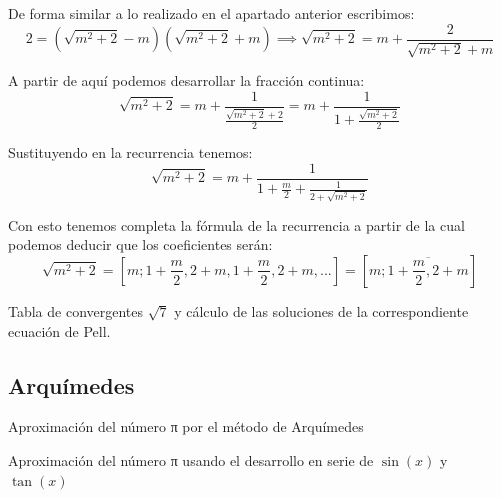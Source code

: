 \begin{problem}[27]
\spart

De forma similar a lo realizado en el apartado anterior escribimos:
\[2=(\sqrt{m^2+2}-m)(\sqrt{m^2+2}+m) \implies \sqrt{m^2+2} = m + \frac{2}{\sqrt{m^2+2}+m}\]

A partir de aquí podemos desarrollar la fracción continua:
\[\sqrt{m^2+2} = m + \frac{1}{\frac{\sqrt{m^2+2}+2}{2}}=m + \frac{1}{1+\frac{\sqrt{m^2+2}}{2}}\]

Sustituyendo en la recurrencia tenemos:
\[\sqrt{m^2+2}  = m + \frac{1}{1+\frac{m}{2}+\frac{1}{2+\sqrt{m^2+2}}} \]

Con esto tenemos completa la fórmula de la recurrencia a partir de la cual podemos deducir que los coeficientes serán:
\[\sqrt{m^2+2}=[m;1+\frac{m}{2},2+m,1+\frac{m}{2},2+m,...] = [m; \overline{1+\frac{m}{2},2+m}]\]
\end{problem}

\begin{problem}[28]
Tabla de convergentes $\sqrt{7}$ y cálculo de las soluciones de la correspondiente ecuación de Pell.
\solution

\end{problem}

\subsection{Arquímedes}

\begin{problem}[29]
Aproximación del número π por el método de Arquímedes
\solution

\end{problem}

\begin{problem}[30]
Aproximación del número π usando el desarrollo en serie de $\sin(x)$ y $
\tan(x)$
\solution

\end{problem}